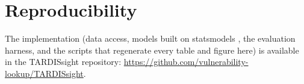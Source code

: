 \documentclass[]{article}
\begin{document}
\section*{Reproducibility}
The implementation (data access, models built on statsmodels
\cite{seabold2010statsmodels}, the evaluation harness, and the scripts that
regenerate every table and figure here) is available in the TARDISsight
repository: \url{https://github.com/vulnerability-lookup/TARDISsight}.

{}

\end{document}
